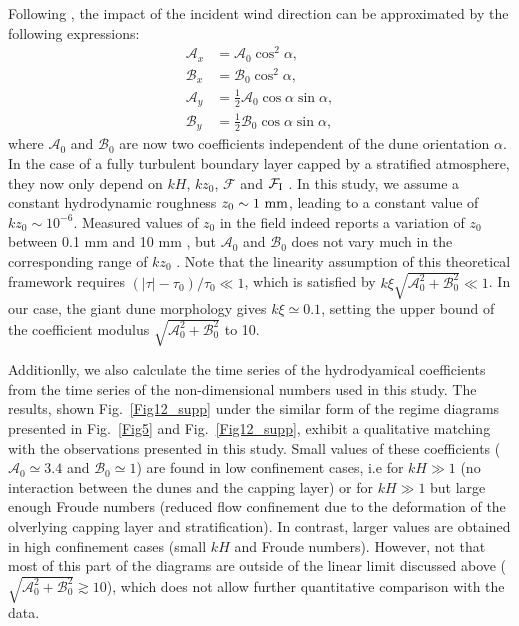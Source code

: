 Following \citet{Andreotti2012}, the impact of the incident wind direction can be approximated by the following expressions:
\begin{align}
  \mathcal{A}_{x} & = \mathcal{A}_{0}\cos^{2}\alpha, \\
  \mathcal{B}_{x} & = \mathcal{B}_{0}\cos^{2}\alpha, \\
  \mathcal{A}_{y} & = \displaystyle\frac{1}{2}\mathcal{A}_{0}\cos\alpha \sin\alpha, \\
  \mathcal{B}_{y} & = \displaystyle\frac{1}{2}\mathcal{B}_{0}\cos\alpha \sin\alpha,
\end{align}
where $\mathcal{A}_{0}$ and $\mathcal{B}_{0}$ are now two coefficients independent of the dune orientation $\alpha$. In the case of a fully turbulent boundary layer capped by a stratified atmosphere, they now only depend on $k H$, $k z_{0}$, $\mathcal{F}$ and $\mathcal{F}_{\textup{I}}$ \citet{andreotti2009}. In this study, we assume a constant hydrodynamic roughness $z_{0} \sim 1~\textup{mm}$, leading to a constant value of $k z_{0} \sim 10^{-6}$. Measured values of $z_{0}$ in the field indeed reports a variation of $z_{0}$ between 0.1 mm and 10 mm \citep{Sherman2008, Field2018}, but $\mathcal{A}_{0}$ and $\mathcal{B}_{0}$ does not vary much in the corresponding range of $k z_{0}$ \citep{Fourriere2010}.
%
Note that the linearity assumption of this theoretical framework requires $\left(\vert \tau \vert - \tau_{0}\right)/\tau_{0} \ll 1$, which is satisfied by $k\xi\sqrt{\mathcal{A}_{0}^{2} + \mathcal{B}_{0}^{2}} \ll 1$. In our case, the giant dune morphology gives $k\xi \simeq 0.1$, setting the upper bound of the coefficient modulus $\sqrt{\mathcal{A}_{0}^{2} + \mathcal{B}_{0}^{2}}$ to 10.


Additionlly, we also calculate the time series of the hydrodyamical coefficients from the time series of the non-dimensional numbers used in this study. The results, shown Fig.~\ref{Fig12_supp} under the similar form of the regime diagrams presented in Fig.~\ref{Fig5} and Fig.~\ref{Fig12_supp}, exhibit a qualitative matching with the observations presented in this study.
%
Small values of these coefficients ($\mathcal{A}_{0} \simeq 3.4$ and $\mathcal{B}_{0} \simeq 1$) are found in low confinement cases, i.e for $k H \gg 1$ (no interaction between the dunes and the capping layer) or for $k H \gg 1$ but large enough Froude numbers (reduced flow confinement due to the deformation of the olverlying capping layer and stratification). In contrast, larger values are obtained in high confinement cases (small $k H$ and Froude numbers). However, not that most of this part of the diagrams are outside of the linear limit discussed above ($\sqrt{\mathcal{A}_{0}^{2} + \mathcal{B}_{0}^{2}} \gtrsim 10$), which does not allow further quantitative comparison with the data.


